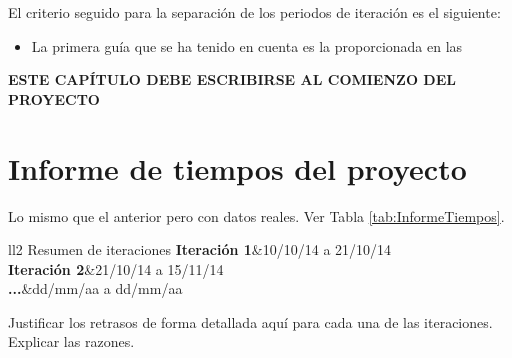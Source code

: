 El criterio seguido para la separación de los periodos de iteración es el siguiente:
\begin{itemize}
	\item La primera guía que se ha tenido en cuenta es la proporcionada en las 
\end{itemize}

\textbf{ESTE CAPÍTULO DEBE ESCRIBIRSE AL COMIENZO DEL PROYECTO}

\section{Informe de tiempos del proyecto}

Lo mismo que el anterior pero con datos reales. Ver Tabla \ref{tab:InformeTiempos}.

\begin{table*}[htb]
	\centering
	\begin{coolTable}{ll}{2}
{Resumen de iteraciones}
	\textbf{Iteración 1}&10/10/14 a 21/10/14\\
	\textbf{Iteración 2}&21/10/14 a 15/11/14\\
	\textbf{...}&dd/mm/aa a dd/mm/aa\\
	\end{coolTable}
	\caption{Planificación temporal de iteraciones\label{tab:InformeTiempos}}
\end{table*}

Justificar los retrasos de forma detallada aquí para cada una de las iteraciones. Explicar las razones.